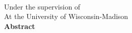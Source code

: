 \fancyhf{} %
\fancyhead[RO,R]{\thepage} %
\renewcommand{\headrulewidth}{0pt}

\begin{center}
    \Large
    \textbf{\thesistitle} \\
    \large
    \thesissubtitle
    
    \vspace{0.4cm}
    \textbf{\myname} 
    
    \vspace{0.4cm}
    Under the supervision of \advisor \\
    At the University of Wisconsin-Madison\\
    
    \vspace{0.9cm}
    \textbf{Abstract}
\end{center}

